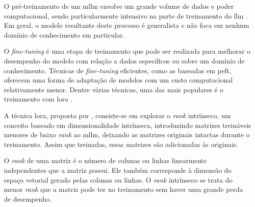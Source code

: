 O pré-treinamento de um \ac{mllm} envolve um grande volume de dados e poder computacional, sendo particularmente
intensivo na parte de treinamento do \ac{llm} \cite{mllm_survey_2024}. Em geral, o modelo resultante deste processo é
generalista e não foca em nenhum domínio de conhecimento em particular.

O \textit{fine-tuning} é uma etapa de treinamento que pode ser realizada para melhorar o desempenho do modelo com
relação a dados específicos ou sobre um domínio de conhecimento. Técnicas de \textit{fine-tuning} eficientes, como as
baseadas em \ac{peft}, oferecem uma forma de adaptação de modelos com um custo computacional relativamente menor.
Dentre
várias técnicas, uma das mais populares é o treinamento com \ac{lora} \cite{llm_survey_2023}.

A técnica \ac{lora}, proposta por \textcite{hu2021lora}, consiste-se em explorar o \textit{rank} intrínseco, um
conceito baseado em dimensionalidade intrínseca, introduzindo matrizes treináveis menores de baixo \textit{rank} ao
\ac{mllm}, deixando as matrizes originais intactas durante o treinamento. Assim que treinadas, essas matrizes são
adicionadas às originais.

O \textit{rank} de uma matriz é o número de colunas ou linhas linearmente independentes que a matriz possui. Ele também
corresponde à dimensão do espaço vetorial gerado pelas colunas ou linhas. O \textit{rank} intrínseco se trata do menor
\textit{rank} que a matriz pode ter no treinamento sem haver uma grande perda de desempenho.

